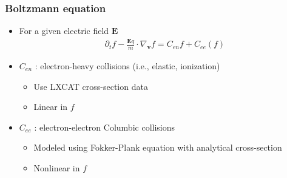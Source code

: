 \documentclass[mathserif, aspectratio=169]{beamer}
\newcommand{\vect}[1]{\boldsymbol{#1}}
\newcommand{\myint}{\int\limits}
\newcommand{\diff}[1]{\, d#1}
\begin{document}
\begin{frame}
	\frametitle{Boltzmann equation}
	\begin{itemize}
		\item For a given electric field $\vect{E}$
		\begin{align}
			\partial_t f -\frac{\vect{E} q}{m} \cdot \nabla_{\vect{v }}f = C_{en}f + C_{ee}(f)
		\end{align}
		\item $C_{en}$ : electron-heavy collisions (i.e., elastic, ionization)
		\begin{itemize}
			\item Use LXCAT cross-section data 
			\item Linear in $f$
		\end{itemize} 
		\item $C_{ee}$ : electron-electron Columbic collisions 
		\begin{itemize}
			\item Modeled using Fokker-Plank equation with analytical cross-section
			\item Nonlinear in $f$
		\end{itemize}
	\end{itemize}
\end{frame}
\end{document}
